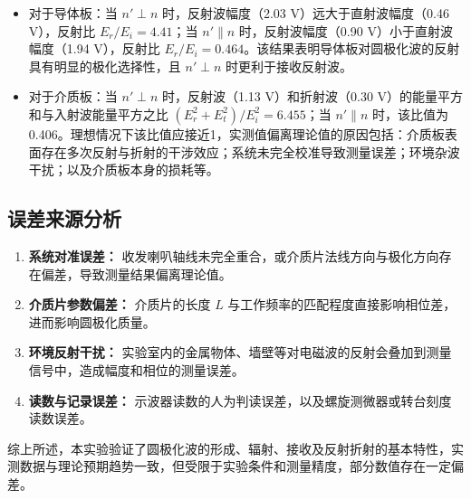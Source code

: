 \documentclass{../ElectromagneticFieldTemplate}
\begin{document}
\begin{itemize}
    \item 对于导体板：当 \(n' \perp n\) 时，反射波幅度（2.03 V）远大于直射波幅度（0.46 V），反射比 \(E_r/E_i = 4.41\)；当 \(n' \parallel n\) 时，反射波幅度（0.90 V）小于直射波幅度（1.94 V），反射比 \(E_r/E_i = 0.464\)。该结果表明导体板对圆极化波的反射具有明显的极化选择性，且 \(n' \perp n\) 时更利于接收反射波。
    
    \item 对于介质板：当 \(n' \perp n\) 时，反射波（1.13 V）和折射波（0.30 V）的能量平方和与入射波能量平方之比 \((E_r^2 + E_t^2)/E_i^2 = 6.455\)；当 \(n' \parallel n\) 时，该比值为 0.406。理想情况下该比值应接近1，实测值偏离理论值的原因包括：介质板表面存在多次反射与折射的干涉效应；系统未完全校准导致测量误差；环境杂波干扰；以及介质板本身的损耗等。
\end{itemize}

\subsection{误差来源分析}
\begin{enumerate}
    \item \textbf{系统对准误差：} 收发喇叭轴线未完全重合，或介质片法线方向与极化方向存在偏差，导致测量结果偏离理论值。
    \item \textbf{介质片参数偏差：} 介质片的长度 \(L\) 与工作频率的匹配程度直接影响相位差，进而影响圆极化质量。
    \item \textbf{环境反射干扰：} 实验室内的金属物体、墙壁等对电磁波的反射会叠加到测量信号中，造成幅度和相位的测量误差。
    \item \textbf{读数与记录误差：} 示波器读数的人为判读误差，以及螺旋测微器或转台刻度读数误差。
\end{enumerate}

综上所述，本实验验证了圆极化波的形成、辐射、接收及反射折射的基本特性，实测数据与理论预期趋势一致，但受限于实验条件和测量精度，部分数值存在一定偏差。
\end{document}
